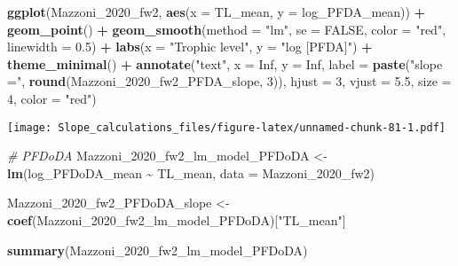 \documentclass[
]{article}
\newenvironment{Shaded}{\begin{snugshade}}{\end{snugshade}}
\newcommand{\AttributeTok}[1]{\textcolor[rgb]{0.13,0.29,0.53}{#1}}
\newcommand{\CommentTok}[1]{\textcolor[rgb]{0.56,0.35,0.01}{\textit{#1}}}
\newcommand{\ConstantTok}[1]{\textcolor[rgb]{0.56,0.35,0.01}{#1}}
\newcommand{\DecValTok}[1]{\textcolor[rgb]{0.00,0.00,0.81}{#1}}
\newcommand{\FloatTok}[1]{\textcolor[rgb]{0.00,0.00,0.81}{#1}}
\newcommand{\FunctionTok}[1]{\textcolor[rgb]{0.13,0.29,0.53}{\textbf{#1}}}
\newcommand{\NormalTok}[1]{#1}
\newcommand{\OtherTok}[1]{\textcolor[rgb]{0.56,0.35,0.01}{#1}}
\newcommand{\SpecialCharTok}[1]{\textcolor[rgb]{0.81,0.36,0.00}{\textbf{#1}}}
\newcommand{\StringTok}[1]{\textcolor[rgb]{0.31,0.60,0.02}{#1}}
\begin{document}
\begin{Shaded}
\begin{Highlighting}[]
\FunctionTok{ggplot}\NormalTok{(Mazzoni\_2020\_fw2, }\FunctionTok{aes}\NormalTok{(}\AttributeTok{x =}\NormalTok{ TL\_mean, }\AttributeTok{y =}\NormalTok{ log\_PFDA\_mean)) }\SpecialCharTok{+}
  \FunctionTok{geom\_point}\NormalTok{() }\SpecialCharTok{+}
  \FunctionTok{geom\_smooth}\NormalTok{(}\AttributeTok{method =} \StringTok{"lm"}\NormalTok{, }\AttributeTok{se =} \ConstantTok{FALSE}\NormalTok{, }\AttributeTok{color =} \StringTok{"red"}\NormalTok{, }\AttributeTok{linewidth =} \FloatTok{0.5}\NormalTok{) }\SpecialCharTok{+}
  \FunctionTok{labs}\NormalTok{(}\AttributeTok{x =} \StringTok{"Trophic level"}\NormalTok{,}
       \AttributeTok{y =} \StringTok{"log [PFDA]"}\NormalTok{) }\SpecialCharTok{+}
  \FunctionTok{theme\_minimal}\NormalTok{() }\SpecialCharTok{+}
  \FunctionTok{annotate}\NormalTok{(}\StringTok{"text"}\NormalTok{, }\AttributeTok{x =} \ConstantTok{Inf}\NormalTok{, }\AttributeTok{y =} \ConstantTok{Inf}\NormalTok{, }\AttributeTok{label =} \FunctionTok{paste}\NormalTok{(}\StringTok{"slope ="}\NormalTok{, }\FunctionTok{round}\NormalTok{(Mazzoni\_2020\_fw2\_PFDA\_slope, }\DecValTok{3}\NormalTok{)), }
           \AttributeTok{hjust =} \DecValTok{3}\NormalTok{, }\AttributeTok{vjust =} \FloatTok{5.5}\NormalTok{, }\AttributeTok{size =} \DecValTok{4}\NormalTok{, }\AttributeTok{color =} \StringTok{"red"}\NormalTok{)}
\end{Highlighting}
\end{Shaded}

\texttt{[image: Slope\_calculations\_files/figure-latex/unnamed-chunk-81-1.pdf]}

\begin{Shaded}
\begin{Highlighting}[]
\CommentTok{\# PFDoDA}
\NormalTok{Mazzoni\_2020\_fw2\_lm\_model\_PFDoDA }\OtherTok{\textless{}{-}} \FunctionTok{lm}\NormalTok{(log\_PFDoDA\_mean }\SpecialCharTok{\textasciitilde{}}\NormalTok{ TL\_mean,}
                                      \AttributeTok{data =}\NormalTok{ Mazzoni\_2020\_fw2)}

\NormalTok{Mazzoni\_2020\_fw2\_PFDoDA\_slope }\OtherTok{\textless{}{-}} \FunctionTok{coef}\NormalTok{(Mazzoni\_2020\_fw2\_lm\_model\_PFDoDA)[}\StringTok{"TL\_mean"}\NormalTok{]}

\FunctionTok{summary}\NormalTok{(Mazzoni\_2020\_fw2\_lm\_model\_PFDoDA)}
\end{Highlighting}
\end{Shaded}
\end{document}
